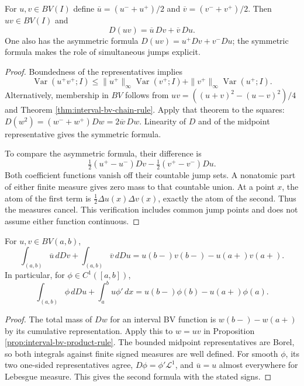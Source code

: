 \begin{proposition}\label{prop:interval-bv-product-rule}
For $u,v\in BV(I)$ define $\overline u=(u^-+u^+)/2$ and $\overline v=(v^-+v^+)/2$. Then $uv\in BV(I)$ and
\[
 D(uv)=\overline u\,Dv+\overline v\,Du.
\]
One also has the asymmetric formula $D(uv)=u^+Dv+v^-Du$; the symmetric formula makes the role of simultaneous jumps explicit.
\end{proposition}
\begin{proof}
Boundedness of the representatives implies
\[
 \operatorname{Var}(u^+v^+;I)
 \leq\|u^+\|_\infty\operatorname{Var}(v^+;I)
 +\|v^+\|_\infty\operatorname{Var}(u^+;I).
\]
Alternatively, membership in $BV$ follows from $uv=((u+v)^2-(u-v)^2)/4$ and Theorem \ref{thm:interval-bv-chain-rule}. Apply that theorem to the squares: $D(w^2)=(w^-+w^+)Dw=2\overline w\,Dw$. Linearity of $D$ and of the midpoint representative gives the symmetric formula.

To compare the asymmetric formula, their difference is
\[
 \tfrac12(u^+-u^-)Dv-\tfrac12(v^+-v^-)Du.
\]
Both coefficient functions vanish off their countable jump sets. A nonatomic part of either finite measure gives zero mass to that countable union. At a point $x$, the atom of the first term is $\tfrac12\Delta u(x)\Delta v(x)$, exactly the atom of the second. Thus the measures cancel. This verification includes common jump points and does not assume either function continuous.
\end{proof}

\begin{corollary}\label{cor:interval-bv-stieltjes-parts}
For $u,v\in BV(a,b)$,
\[
 \int_{(a,b)}\overline u\,dDv+\int_{(a,b)}\overline v\,dDu
 =u(b-)v(b-)-u(a+)v(a+).
\]
In particular, for $\phi\in C^1([a,b])$,
\[
 \int_{(a,b)}\phi\,dDu+\int_a^bu\phi'\,dx
 =u(b-)\phi(b)-u(a+)\phi(a).
\]
\end{corollary}
\begin{proof}
The total mass of $Dw$ for an interval BV function is $w(b-)-w(a+)$ by its cumulative representation. Apply this to $w=uv$ in Proposition \ref{prop:interval-bv-product-rule}. The bounded midpoint representatives are Borel, so both integrals against finite signed measures are well defined. For smooth $\phi$, its two one-sided representatives agree, $D\phi=\phi'\mathcal L^1$, and $\overline u=u$ almost everywhere for Lebesgue measure. This gives the second formula with the stated signs.
\end{proof}


